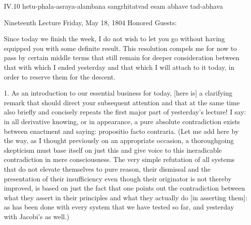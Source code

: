 IV.10
hetu-phala-asraya-alambana sangrhitatvad esam abhave tad-abhava

Nineteenth Lecture
Friday, May 18, 1804
Honored Guests:

Since today we finish the week,
I do not wish to let you go without
having equipped you with some definite result.
This resolution compels me for now to pass by
certain middle terms that still remain
for deeper consideration between
that with which I ended yesterday
and that which I will attach to it today,
in order to reserve them for the descent.

1. As an introduction to our essential business for today,
[here is] a clarifying remark that
should direct your subsequent attention
and that at the same time also briefly and concisely
repeats the first major part of yesterday's lecture!
I say: in all derivative knowing, or in appearance,
a pure absolute contradiction exists
between enactment and saying:
propositio facto contraria.
(Let me add here by the way,
as I thought previously on an appropriate occasion,
a thoroughgoing skepticism must base itself on just this
and give voice to this ineradicable
contradiction in mere consciousness.
The very simple refutation of all systems
that do not elevate themselves to pure reason,
their dismissal and the presentation of their insufficiency
even though their originator is not thereby improved,
is based on just the fact that one points out
the contradiction between what they assert in their principles
and what they actually do [in asserting them]:
as has been done with every system that we have tested so far,
and yesterday with Jacobi's as well.)

